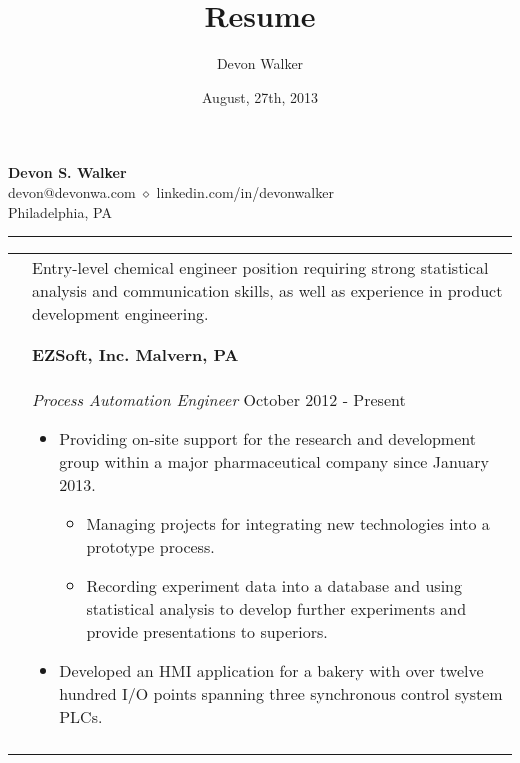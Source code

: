 \documentclass[11pt]{article}
\begin{document}
\title{Resume}			%
\author{Devon Walker}	%
\date{August, 27th, 2013}	%

\thispagestyle{empty}
\pagestyle{empty}

\begin{center}
	{\LARGE\textbf{Devon S. Walker}} \\
	devon@devonwa.com $\diamond$ linkedin.com/in/devonwalker \\
	Philadelphia, PA\hrule
\end{center}

\vspace{0.15in}\noindent
\begin{tabular}[t]{@{}p{1.15in} @{}p{5.35in}}

\begin{comment}
	{Objective} &

		Entry-level chemical engineer position requiring strong statistical analysis and communication skills, as well as experience in product development engineering. \\\\\\
\end{comment}

	{Experience} &

		\textbf{EZSoft, Inc.  \hfill Malvern, PA}\vspace{0.015in} \\ &
		{\textit{Process Automation Engineer} \hfill October 2012 - Present}\vspace{0.015in}
		\begin{itemize}
			\renewcommand{\labelitemi}{$\diamond$}
			\item Providing on-site support for the research and development group within a major pharmaceutical company since January 2013.
			\begin{itemize}
				\renewcommand{\labelitemii}{$\cdot$}
				\item Managing projects for integrating new technologies into a prototype process.
				\item Recording experiment data into a database and using statistical analysis to develop further experiments and provide presentations to superiors.
			\end{itemize}
			\item Developed an HMI application for a bakery with over twelve hundred I/O points spanning three synchronous control system PLCs.
		\end{itemize} \\ &



\end{tabular}
\end{document}
